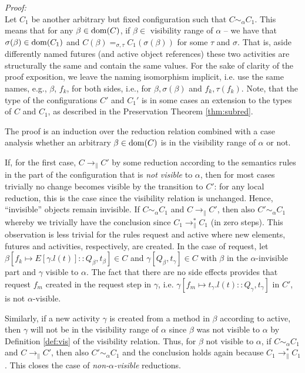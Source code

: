 \documentclass[10pt, conference, compsocconf]{IEEEtran}
\newcommand\dom{{\rm dom}}
\newcommand\inda{\sim_{\alpha}}
\newcommand\dist{\ensuremath{\to_\|}}
\newcommand\diststar{\ensuremath{\to_\|^*}}
\begin{document}
{\it Proof:}\\
Let $C_1$ be another arbitrary but fixed configuration such that $C \inda C_1$.
This means that for any $\beta \in \dom(C)$, if $\beta \in$ visibility range of $\alpha$ -- 
we have that $\sigma(\beta) \in \dom(C_1)$ and $C(\beta) =_{\sigma,\tau} C_1(\sigma(\beta))$ for some $\tau$ and $\sigma$. 
That is, aside differently named  futures (and active object references) these two activities are structurally 
the same and contain the same values.
For the sake of clarity of the proof exposition, we leave the naming isomorphism
implicit, i.e. use the same names, e.g., $\beta$, $f_k$, for both sides, i.e., 
for $\beta, \sigma(\beta)$ and $f_k, \tau(f_k)$.
Note, that
the type of the configurations $C'$ and $C_1'$ is in some cases an extension to the types of $C$ and $C_1$, 
as described in the Preservation Theorem \ref{thm:subred}.


The proof is an induction over the reduction relation combined with a case analysis whether an arbitrary 
$\beta \in \dom(C)$ is in the visibility range of $\alpha$ or not.

If, for the first case, $C \dist C'$ by some reduction according to the semantics rules in the part of the configuration
that is {\it not visible} to $\alpha$, then for most cases trivially no change becomes visible by the transition to $C'$:
for any local reduction, this is the case since the visibility relation is unchanged. Hence, ``invisible'' objects remain invisible. 
If $C \inda C_1$ and $C \dist C'$, then also $C' \inda C_1$ whereby we trivially have the conclusion since
$C_1 \diststar C_1$ (in zero steps).
This observation is less trivial for the rules {\sc request} and {\sc active} where 
new elements, futures and activities, respectively, are created. In the case of {\sc request}, 
let $\beta[f_k \mapsto E[\gamma.l(t)] :: Q_\beta, t_\beta] \in C$ and $\gamma[Q_\beta,t_\gamma] \in C$ 
with $\beta$ in the $\alpha$-invisible part and $\gamma$ visible to $\alpha$.
The fact that there are no side effects provides that request $f_m$ 
created in the request step in $\gamma$, i.e. $\gamma[f_m \mapsto t_\gamma.l(t):: Q_\gamma, t_\gamma]$ in $C'$, 
is not $\alpha$-visible.

Similarly, if a new activity $\gamma$ is created from a method in $\beta$ according to {\sc active}, 
then $\gamma$ will not be in the visibility range of $\alpha$ since $\beta$ was not visible to $\alpha$ by Definition \ref{def:vis} of the visibility relation. 
Thus, for $\beta$ not visible to $\alpha$, if $C \inda C_1$ and $C \dist C'$, then also $C' \inda C_1$ 
and the conclusion holds again because $C_1 \diststar C_1$. This closes the case of 
{\it non-$\alpha$-visible} reductions.
\end{document}
